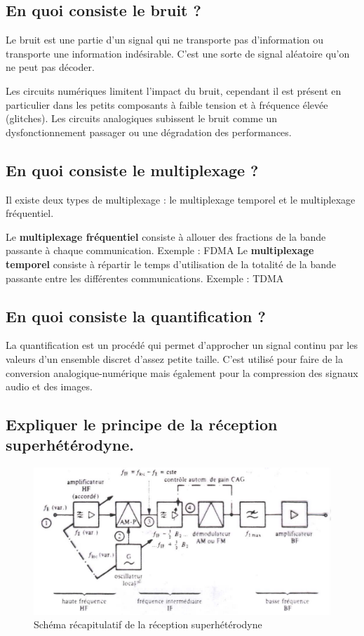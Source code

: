 \subsection{En quoi consiste le bruit ?}

Le bruit est une partie d'un signal qui ne transporte pas d'information ou transporte une information indésirable. C'est une sorte de signal aléatoire qu'on ne peut pas décoder.

Les circuits numériques limitent l'impact du bruit, cependant il est présent en particulier dans les petits composants à faible tension et à fréquence élevée (glitches). Les circuits analogiques subissent le bruit comme un dysfonctionnement passager ou une dégradation des performances.

\subsection{En quoi consiste le multiplexage ?}

Il existe deux types de multiplexage : le multiplexage temporel et le multiplexage fréquentiel.

Le \textbf{multiplexage fréquentiel} consiste à allouer des fractions de la bande passante à chaque communication. Exemple : FDMA \newline
Le \textbf{multiplexage temporel} consiste à répartir le temps d'utilisation de la totalité de la bande passante entre les différentes communications. Exemple : TDMA \newline

\subsection{En quoi consiste la quantification ?}

La quantification est un procédé qui permet d'approcher un signal continu par les valeurs d'un ensemble discret d'assez petite taille.  C'est utilisé pour faire de la conversion analogique-numérique mais également pour la compression des signaux audio et des images.  

\subsection{Expliquer le principe de la réception superhétérodyne.}

\begin{figure}[H]
    \centering
    \includegraphics[width=\linewidth]{img/reception_superheterodyne.png}
    \caption{Schéma récapitulatif de la réception superhétérodyne}
\end{figure}

